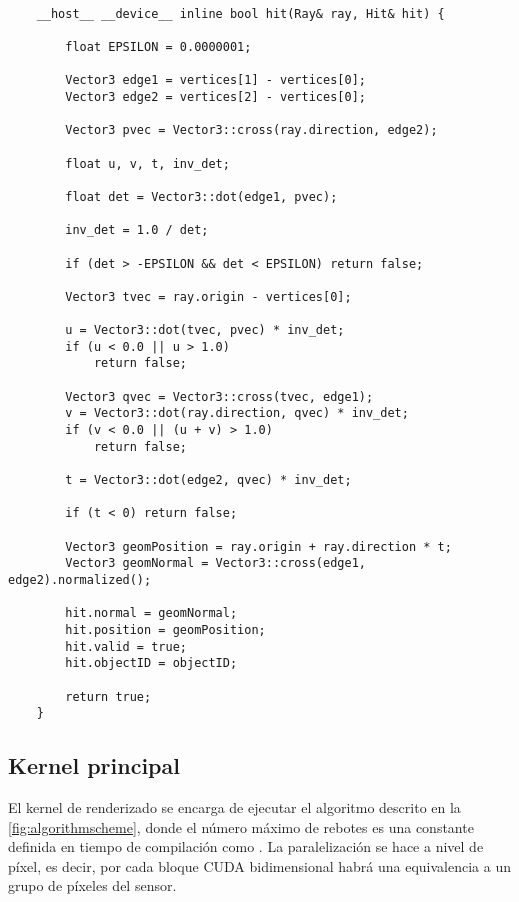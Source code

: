 \begin{minipage}[c]{0.95\textwidth}
\begin{lstlisting}[label={cod:triintersection}, caption={Adaptación de código Fast Minimum Storage Ray/Triangle Intersection\cite{moller1997fast} a Eleven Renderer}]
	
	__host__ __device__ inline bool hit(Ray& ray, Hit& hit) {

		float EPSILON = 0.0000001;

        Vector3 edge1 = vertices[1] - vertices[0];
        Vector3 edge2 = vertices[2] - vertices[0];

        Vector3 pvec = Vector3::cross(ray.direction, edge2);

        float u, v, t, inv_det;

        float det = Vector3::dot(edge1, pvec);

        inv_det = 1.0 / det;

        if (det > -EPSILON && det < EPSILON) return false;

        Vector3 tvec = ray.origin - vertices[0];

        u = Vector3::dot(tvec, pvec) * inv_det;
        if (u < 0.0 || u > 1.0)
            return false;

        Vector3 qvec = Vector3::cross(tvec, edge1);
        v = Vector3::dot(ray.direction, qvec) * inv_det;
        if (v < 0.0 || (u + v) > 1.0)
            return false;

        t = Vector3::dot(edge2, qvec) * inv_det;

        if (t < 0) return false;

        Vector3 geomPosition = ray.origin + ray.direction * t;
		Vector3 geomNormal = Vector3::cross(edge1, edge2).normalized();
		
		hit.normal = geomNormal;
		hit.position = geomPosition;
		hit.valid = true;
		hit.objectID = objectID;

        return true;
	}

\end{lstlisting}
\end{minipage}

\subsection{Kernel principal}
	
El kernel de renderizado  se encarga de ejecutar el algoritmo descrito en la \autoref{fig:algorithmscheme}, donde el número máximo de rebotes es una constante definida en tiempo de compilación como . La paralelización se hace a nivel de píxel, es decir, por cada bloque CUDA bidimensional habrá una equivalencia a un grupo de píxeles del sensor.

